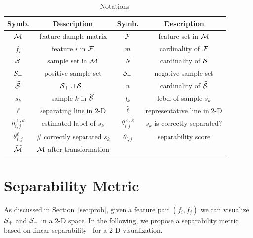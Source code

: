 \begin{table}[t!]
\vspace{-10pt}
\centering
\small
\begin{tabular}{c|c|c|c}
   Symb. & Description & Symb. & Description\\
    \hline
    \hline
    $\mm$ & feature-dample matrix & $\ff$ & feature set in $\mm$ \\
    \hline
    $f_i$ & feature $i$ in $\ff$ & $m$ & cardinality of $\ff$\\
    \hline
    $\sss$ & sample set in $\mm$ & $N$ & cardinality of $\sss$\\
    \hline
    $\sss_+$ & positive sample set & $\sss_-$ & negative sample set\\
    \hline
    $\widehat{\sss}$ & $\sss_+\cup \sss_-$ & $n$ & cardinality of $\widehat{\sss}$\\
    \hline
    $s_k$ & sample $k$ in $\widehat{\sss}$ & $l_k$ & lebel of sample $s_k$\\
    \hline
    $\ell$ & separating line in 2-D & $\hat{\ell}$ & representative line  in 2-D\\
    \hline
    $\eta_{i,j}^{\ell,k}$ & estimated label of $s_k$ & $\theta_{i,j}^{\ell,k}$ & $s_k$ is correctly separated? \\
    \hline
    $\theta_{i,j}^{\ell}$ & \# correctly separated $s_k$ & $\theta_{i,j}$ & separability score\\
    \hline
    $\widehat{\mm}$ & $\mm$ after transformation &  \\
    \hline
 \end{tabular}
\vspace{-6pt}
\caption{Notations}
\label{tbl:notation}
\vspace{-18pt}
\end{table}

\section{Separability Metric}\label{sec:metric}

As discussed in Section~\ref{sec:prob}, given a feature pair $(f_i,f_j)$ we can visualize $\sss_+$ and $\sss_-$ in a 2-D space. In the following, we propose a separability metric based on linear separability~\cite{shamos1975geometric} for a 2-D visualization. 

